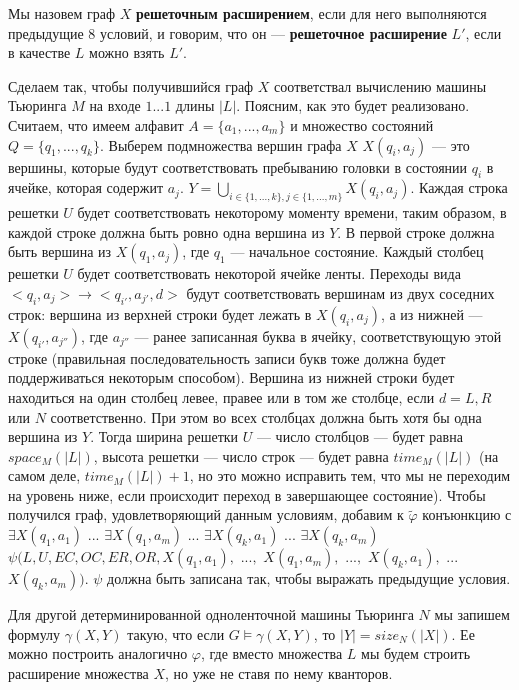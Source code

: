 \documentclass{article}
\begin{document}
Мы назовем граф $X$ {\bf решеточным расширением}, если для него выполняются предыдущие 8 условий, и говорим, что он --- {\bf решеточное расширение} $L'$, если в качестве $L$ можно взять $L'$.

Сделаем так, чтобы получившийся граф $X$ соответствал вычислению машины Тьюринга $M$ на входе $1...1$ длины $|L|$. Поясним, как это будет реализовано. Считаем, что имеем алфавит $A = \{ a_1, ..., a_m \}$ и множество состояний $Q = \{q_1, ..., q_k\}$. Выберем подмножества вершин графа $X$ $X(q_i, a_j)$ --- это вершины, которые будут соответствовать пребыванию головки в состоянии $q_i$ в ячейке, которая содержит $a_j$. $Y = \bigcup_{i \in \{1, ..., k\}, j \in \{1, ..., m\} } X(q_i, a_j)$. Каждая строка решетки $U$ будет соответствовать некоторому моменту времени, таким образом, в каждой строке должна быть ровно одна вершина из $Y$. В первой строке должна быть вершина из $X(q_1, a_j)$, где $q_1$ --- начальное состояние. Каждый столбец решетки $U$ будет соответствовать некоторой ячейке ленты. Переходы вида $<q_i, a_j> \rightarrow <q_{i'}, a_{j'}, d>$ будут соответствовать вершинам из двух соседних строк: вершина из верхней строки будет лежать в $X(q_i, a_j)$, а из нижней --- $X(q_{i'}, a_{j''})$, где $a_{j''}$ --- ранее записанная буква в ячейку, соответствующую этой строке (правильная последовательность записи букв тоже должна будет поддерживаться некоторым способом). Вершина из нижней строки будет находиться на один столбец левее, правее или в том же столбце, если $d = L, R$ или $N$ соответственно. При этом во всех столбцах должна быть хотя бы одна вершина из $Y$. Тогда ширина решетки $U$ --- число столбцов ---  будет равна $space_M (|L|)$, высота решетки --- число строк --- будет равна $time_M (|L|)$ (на самом деле, $time_M (|L|)+1$, но это можно исправить тем, что мы не переходим на уровень ниже, если происходит переход в завершающее состояние). Чтобы получился граф, удовлетворяющий данным условиям, добавим к $\tilde{\varphi}$ конъюнкцию с $\exists X(q_1, a_1)$ $... $ $\exists X(q_1, a_m)$ $...$ $\exists X(q_k, a_1)$ $...$ $\exists X(q_k, a_m)$ $\psi (L, U, EC, OC, ER, OR, X(q_1, a_1),$ $...,$ $X(q_1, a_m),$ $...,$ $X(q_k, a_1),$ $...$ $X(q_k, a_m)) $. $\psi$ должна быть записана так, чтобы выражать предыдущие условия.

Для другой детерминированной одноленточной машины Тьюринга $N$ мы запишем формулу $\gamma (X, Y)$ такую, что если $G \models \gamma (X, Y)$, то $|Y| = size_{N} (|X|)$. Ее можно построить аналогично $\varphi$, где вместо множества $L$ мы будем строить расширение множества $X$, но уже не ставя по нему кванторов.
\end{document}
